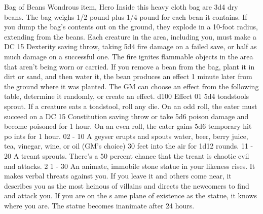 Bag of Beans
Wondrous item, Hero
Inside this heavy cloth bag are 3d4 dry beans. The bag weighs 1/2 pound plus 1/4 pound for each bean it contains.
If you dump the bag's contents out on the ground, they explode in a 10-foot radius, extending from the beans. Each creature in the area, including you, must make a DC 15 Dexterity saving
throw, taking 5d4 fire damage on a failed save, or half as much damage on a successful one. The fire ignites flammable objects in the area that aren't being worn or carried.
If you remove a bean from the bag, plant it in dirt or sand, and then water it, the bean produces an effect 1 minute later from the ground where it was planted. The GM can choose an effect from the following table, determine it randomly, or create an effect.
d100      Effect                                                                                                                                                                                                                                                                                                                                                                         
01        5d4 toadstools sprout. If a creature eats a  toadstool, roll any die. On an odd roll, the eater  must succeed on a DC 15 Constitution saving  throw or take 5d6 poison damage and become  poisoned for 1 hour. On an even roll, the eater  gains 5d6 temporary hit po ints for 1 hour.                                                                                         
02 - 10   A geyser erupts and spouts water, beer, berry  juice, tea, vinegar, wine, or oil (GM's choice) 30  feet into the air for 1d12 rounds.                                                                                                                                                                                                                                          
11 - 20   A treant sprouts. There's a 50 percent chance  that the treant is chaotic evil and attacks.                                                                                                                                                                                                                                                                                    
2 1 - 30  An animate, immobile stone statue in your  likeness rises. It makes verbal threats against  you. If you leave it and others come near, it  describes you as the most heinous of villains and  directs the newcomers to find and attack you. If  you are on the s ame plane of existence as the  statue, it knows where you are. The statue  becomes inanimate after 24 hours.  
